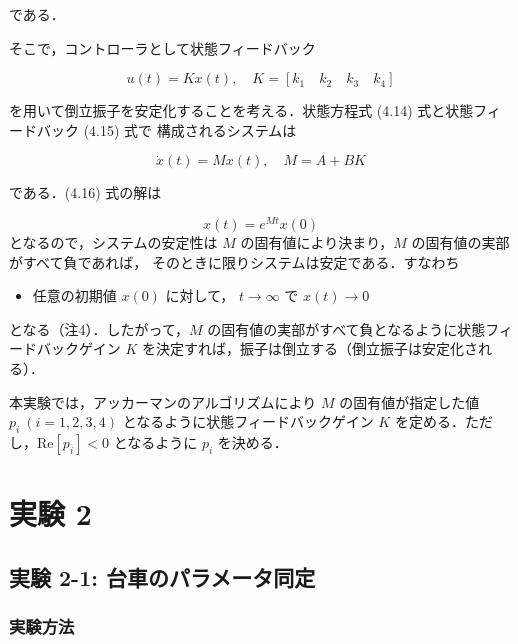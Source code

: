である．

そこで，コントローラとして状態フィードバック

\[
  u(t) = Kx(t), \quad K = [k_1 \quad k_2 \quad k_3 \quad k_4] \tag{4.15}
\]

を用いて倒立振子を安定化することを考える．状態方程式 (4.14) 式と状態フィードバック (4.15) 式で
構成されるシステムは

\[
  \dot{x}(t) = Mx(t), \quad M = A + BK \tag{4.16}
\]

である．(4.16) 式の解は

\[
  x(t) = e^{Mt}x(0) \tag{4.17}
\]
となるので，システムの安定性は \( M \) の固有値により決まり，\( M \) の固有値の実部がすべて負であれば，
そのときに限りシステムは安定である．すなわち

\begin{itemize}
  \item 任意の初期値 \( x(0) \) に対して， \( t \to \infty \) で \( x(t) \to 0 \)
\end{itemize}

となる（注4）．したがって，\( M \) の固有値の実部がすべて負となるように状態フィードバックゲイン \( K \) 
を決定すれば，振子は倒立する（倒立振子は安定化される）．

本実験では，アッカーマンのアルゴリズムにより \( M \) の固有値が指定した値 \( p_i \ (i=1,2,3,4) \) 
となるように状態フィードバックゲイン \( K \) を定める．ただし，\( \text{Re}[p_i] < 0 \) となるように
\( p_i \) を決める．

\section{実験 2}
\subsection{実験 2-1: 台車のパラメータ同定}
\subsubsection{実験方法}


